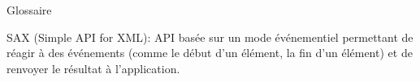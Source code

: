 {\Huge{Glossaire}}

\vspace{2.5cm}
SAX (Simple API for XML): API basée sur un mode événementiel permettant de réagir à des événements (comme le début d'un élément, la fin d'un élément) et de renvoyer le résultat à l'application.